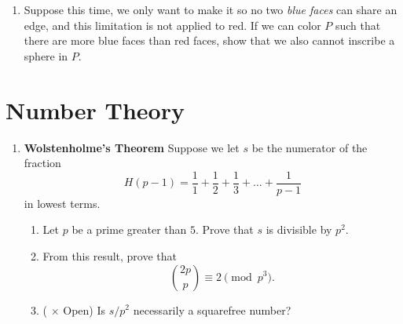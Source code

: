 \documentclass[11pt]{scrartcl}
\begin{document}
\begin{enumerate}[label=\textbf{G\arabic*}.]
\begin{enumerate}
        \item Suppose this time, we only want to make it so no two \textit{blue faces} can share an edge, and this limitation is not applied to red. If we can color $P$ such that there are more blue faces than red faces, show that we also cannot inscribe a sphere in $P$.
    \end{enumerate}
    
    
\end{enumerate}

\newpage
\section{Number Theory}
\begin{enumerate}[label=\textbf{N\arabic*}.]
    \item \textbf{Wolstenholme's Theorem} \newline
    Suppose we let $s$ be the numerator of the fraction
    \[ H(p-1) = \frac{1}{1} + \frac{1}{2} + \frac{1}{3} + \dots + \frac{1}{p-1} \]
    in lowest terms.
    
    \begin{enumerate}
        \item Let $p$ be a prime greater than $5$. Prove that $s$ is divisible by $p^2$.
    
        \item From this result, prove that
        \[ \binom{2p}{p} \equiv 2 \pmod{p^3}. \]
        
        \item (\fullchili \hspace{1pt} $\times$ Open) Is $s/p^2$ necessarily a squarefree number?
    \end{enumerate}
    
\end{enumerate}
\end{document}
